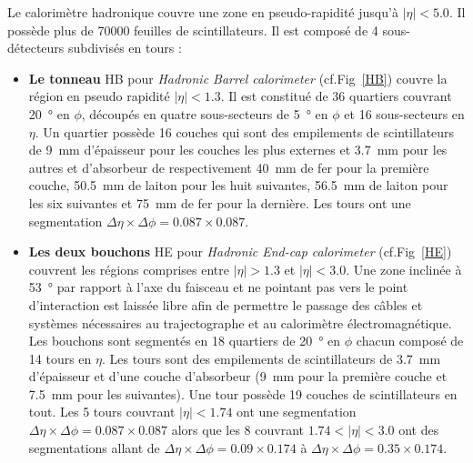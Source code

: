 Le calorimètre hadronique couvre une zone en pseudo-rapidité jusqu'à $|\eta|<\num{5.0}$. Il possède plus de \num{70000} feuilles de scintillateurs. Il est composé de \num{4} sous-détecteurs subdivisés en tours : 
\begin{itemize}[label=$\bullet$]
	\item \textbf{Le tonneau} HB pour \textit{Hadronic Barrel calorimeter} (cf.Fig~\ref{HB}) couvre la région en pseudo rapidité $|\eta|<1.3$. Il est constitué de \num{36} quartiers couvrant \SI{20}{\degree} en $\phi$, découpés en quatre sous-secteurs de \SI{5}{\degree} en $\phi$ et \num{16} sous-secteurs en $\eta$. Un quartier possède \num{16} couches qui sont des empilements de scintillateurs de \SI{9}{\milli\meter} d'épaisseur pour les couches les plus externes et \SI{3.7}{\milli\meter} pour les autres et d'absorbeur de respectivement \SI{40}{\milli\meter} de fer pour la première couche, \SI{50.5}{\milli\meter} de laiton pour les huit suivantes, \SI{56.5}{\milli\meter} de laiton pour les six suivantes et \SI{75}{\milli\meter} de fer pour la dernière. Les tours ont une segmentation $\Delta\eta\times\Delta\phi=\num{0.087}\times\num{0.087}$.
	\item \textbf{Les deux bouchons} HE pour \textit{Hadronic End-cap calorimeter} (cf.Fig~\ref{HE}) couvrent les régions comprises entre $|\eta|>\num{1.3}$ et $|\eta|<\num{3.0}$. Une zone inclinée à \SI{53}{\degree} par rapport à l'axe du faisceau et ne pointant pas vers le point d'interaction est laissée libre afin de permettre le passage des câbles et systèmes nécessaires au trajectographe et au calorimètre électromagnétique. Les bouchons sont segmentés en \num{18} quartiers de \SI{20}{\degree} en $\phi$ chacun composé de \num{14} tours en $\eta$. Les tours sont des empilements de scintillateurs de \SI{3.7}{\milli\meter} d'épaisseur et d'une couche d'absorbeur (\SI{9}{\milli\meter} pour la première couche et \SI{7.5}{\milli\meter} pour les suivantes). Une tour possède \num{19} couches de  scintillateurs en tout. Les \num{5} tours couvrant $|\eta|<\num{1.74}$ ont une segmentation $\Delta\eta\times\Delta\phi=\num{0.087}\times\num{0.087}$ alors que les \num{8} couvrant $\num{1.74}<|\eta|<\num{3.0}$ ont des segmentations allant de $\Delta\eta\times\Delta\phi=\num{0.09}\times\num{0.174}$ à $\Delta\eta\times\Delta\phi=\num{0.35}\times\num{0.174}$.

\end{itemize}
